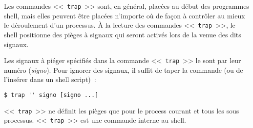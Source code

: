Les commandes <<~\texttt{trap}~>> sont, en g{\'e}n{\'e}ral, plac{\'e}es au d{\'e}but des
programmes shell, mais elles peuvent {\^e}tre plac{\'e}es n'importe o{\`u} de fa\c{c}on
{\`a} contr{\^o}ler au mieux le d{\'e}roulement d'un processus. \`{A} la lecture des
commandes <<~\texttt{trap}~>>, le shell positionne des pi{\`e}ges {\`a} signaux qui seront
activ{\'e}s lors de la venue des dits signaux.

Les signaux {\`a} pi{\'e}ger sp{\'e}cifi{\'e}s dans la commande <<~\texttt{trap}~>> le sont
par leur num{\'e}ro (\textsl{signo}). Pour ignorer des signaux, il suffit de taper la
commande (ou de l'ins{\'e}rer dans un shell script)~:
\begin{center}
\verb*=$ trap '' signo [signo ...]=
\end{center}

<<~\texttt{trap}~>> ne d{\'e}finit les pi{\`e}ges que pour le process courant et tous les sous processus.
<<~\texttt{trap}~>> est une commande interne au shell.
